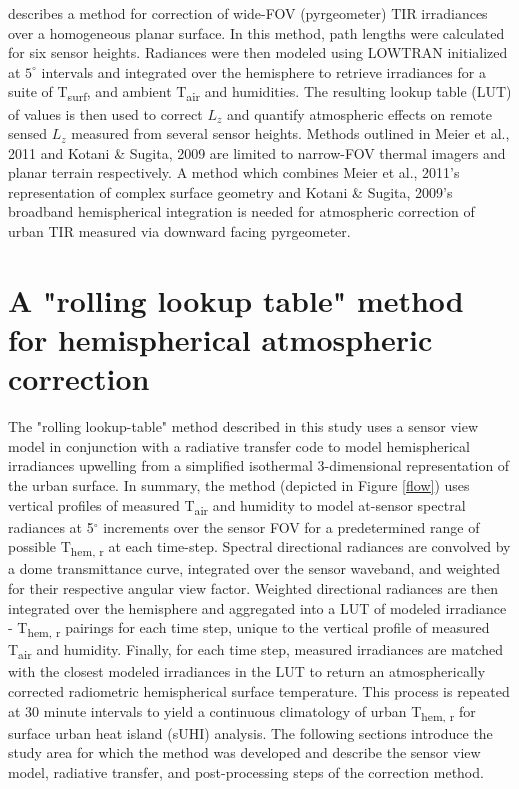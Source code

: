 \begin{bibunit}
\citet{Kotani2009a} describes a method for correction of wide-FOV (pyrgeometer) TIR irradiances over a homogeneous planar surface. In this method, path lengths were calculated for six sensor heights. Radiances were then modeled using LOWTRAN initialized at $5^{\circ}$ intervals and integrated over the hemisphere to retrieve irradiances for a suite of T\textsubscript{surf}, and ambient T\textsubscript{air} and humidities. The resulting lookup table (LUT) of values is then used to correct $L_z$ and quantify atmospheric effects on remote sensed $L_z$ measured from several sensor heights. Methods outlined in Meier et al., 2011 and Kotani \& Sugita, 2009 are limited to narrow-FOV thermal imagers and planar terrain respectively. A method which combines Meier et al., 2011's representation of complex surface geometry and Kotani \& Sugita, 2009's broadband hemispherical integration is needed for atmospheric correction of urban TIR measured via downward facing pyrgeometer.

\section{A "rolling lookup table" method for hemispherical atmospheric correction}


The "rolling lookup-table" method described in this study uses a sensor view model in conjunction with a radiative transfer code to model hemispherical irradiances upwelling from a simplified isothermal 3-dimensional representation of the urban surface. In summary, the method (depicted in Figure \ref{flow}) uses vertical profiles of measured T\textsubscript{air} and humidity to model at-sensor spectral radiances at 5$^{\circ}$ increments over the sensor FOV for a predetermined range of possible T\textsubscript{hem, r} at each time-step. Spectral directional radiances are convolved by a dome transmittance curve, integrated over the sensor waveband, and weighted for their respective angular view factor. Weighted directional radiances are then integrated over the hemisphere and aggregated into a LUT of modeled irradiance - T\textsubscript{hem, r} pairings for each time step, unique to the vertical profile of measured T\textsubscript{air} and humidity. Finally, for each time step, measured irradiances are matched with the closest modeled irradiances in the LUT to return an atmospherically corrected radiometric hemispherical surface temperature. This process is repeated at 30 minute intervals to yield a continuous climatology of urban T\textsubscript{hem, r} for surface urban heat island (sUHI) analysis. The following sections introduce the study area for which the method was developed and describe the sensor view model, radiative transfer, and post-processing steps of the correction method.


\end{bibunit}
